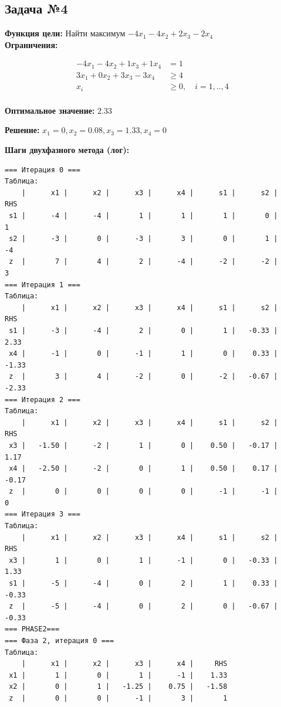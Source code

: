 \documentclass[a4paper,12pt]{article}
\begin{document}
\subsection*{Задача №4}
\textbf{Функция цели: }
Найти максимум $ -4x_{1} -4x_{2} +2x_{3} -2x_{4} $\\

\textbf{Ограничения:}

\[ \begin{aligned}
-4x_{1} -4x_{2} +1x_{3} +1x_{4} &= 1 \\
3x_{1} +0x_{2} +3x_{3} -3x_{4} &\ge 4 \\
x_i &\ge 0,\quad i=1,..,4\\
\end{aligned}\]

\textbf{Оптимальное значение: }$2.33$

\textbf{Решение: }$x_{1}=0, x_{2}=0.08, x_{3}=1.33, x_{4}=0$

\textbf{Шаги двухфазного метода (лог):}

\begin{verbatim}
=== Итерация 0 ===
Таблица:
    |      x1 |      x2 |      x3 |      x4 |      s1 |      s2 |     RHS
 s1 |      -4 |      -4 |       1 |       1 |       1 |       0 |       1
 s2 |      -3 |       0 |      -3 |       3 |       0 |       1 |      -4
 z  |       7 |       4 |       2 |      -4 |      -2 |      -2 |       3
=== Итерация 1 ===
Таблица:
    |      x1 |      x2 |      x3 |      x4 |      s1 |      s2 |     RHS
 s1 |      -3 |      -4 |       2 |       0 |       1 |   -0.33 |    2.33
 x4 |      -1 |       0 |      -1 |       1 |       0 |    0.33 |   -1.33
 z  |       3 |       4 |      -2 |       0 |      -2 |   -0.67 |   -2.33
=== Итерация 2 ===
Таблица:
    |      x1 |      x2 |      x3 |      x4 |      s1 |      s2 |     RHS
 x3 |   -1.50 |      -2 |       1 |       0 |    0.50 |   -0.17 |    1.17
 x4 |   -2.50 |      -2 |       0 |       1 |    0.50 |    0.17 |   -0.17
 z  |       0 |       0 |       0 |       0 |      -1 |      -1 |       0
=== Итерация 3 ===
Таблица:
    |      x1 |      x2 |      x3 |      x4 |      s1 |      s2 |     RHS
 x3 |       1 |       0 |       1 |      -1 |       0 |   -0.33 |    1.33
 s1 |      -5 |      -4 |       0 |       2 |       1 |    0.33 |   -0.33
 z  |      -5 |      -4 |       0 |       2 |       0 |   -0.67 |   -0.33
=== PHASE2===
=== Фаза 2, итерация 0 ===
Таблица:
    |      x1 |      x2 |      x3 |      x4 |     RHS
 x1 |       1 |       0 |       1 |      -1 |    1.33
 x2 |       0 |       1 |   -1.25 |    0.75 |   -1.58
 z  |       0 |       0 |      -1 |       3 |       1
\end{verbatim}
\end{document}
